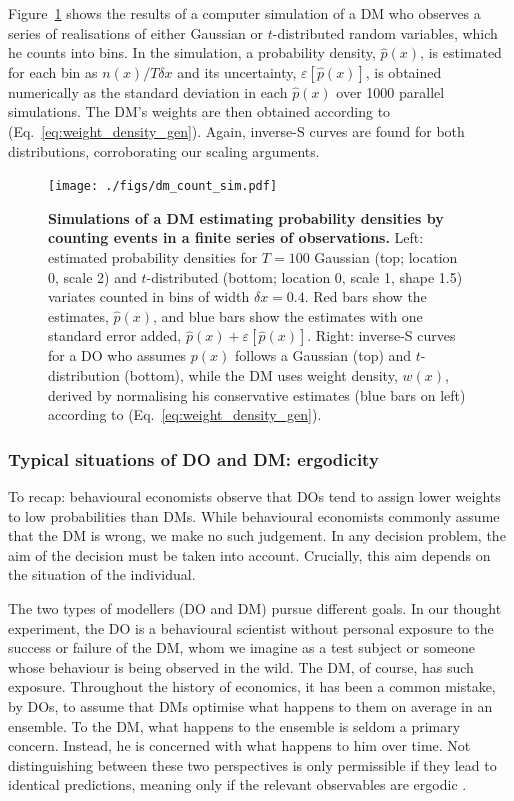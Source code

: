 \documentclass[a4paper, 12pt]{article}
\newcommand{\eref}[1]{(Eq.~\ref{eq:#1})}
\newcommand{\flabel}[1]{\label{fig:#1}}
\newcommand{\Fref}[1]{Figure~\ref{fig:#1}}
\newcommand{\err}[1]{\varepsilon\left[#1\right]}
\newcommand{\phat}{\hat{p}}
\begin{document}
\Fref{dm_count_sim} shows the results of a computer simulation of a DM who observes a series of realisations of either Gaussian or $t$-distributed random variables, which he counts into bins. In the simulation, a probability density, $\phat(x)$, is estimated for each bin as $n(x)/T\delta x$ and its uncertainty, $\err{\phat(x)}$, is obtained numerically as the standard deviation in each $\phat(x)$ over 1000 parallel simulations. The DM's weights are then obtained according to \eref{weight_density_gen}. Again, inverse-S curves are found for both distributions, corroborating our scaling arguments.
\begin{figure}[!htb]
\centering
\texttt{[image: ./figs/dm\_count\_sim.pdf]}
\caption{\textbf{Simulations of a DM estimating probability densities by counting events in a finite series of observations.} Left: estimated probability densities for $T=100$ Gaussian (top; location 0, scale 2) and $t$-distributed (bottom; location 0, scale 1, shape 1.5) variates counted in bins of width $\delta x=0.4$. Red bars show the estimates, $\phat(x)$, and blue bars show the estimates with one standard error added, $\phat(x)+\err{\phat(x)}$. Right: inverse-S curves for a DO who assumes $p(x)$ follows a Gaussian (top) and $t$-distribution (bottom), while the DM uses weight density, $w(x)$, derived by normalising his conservative estimates (blue bars on left) according to \eref{weight_density_gen}.
}
\flabel{dm_count_sim}
\end{figure}

\subsubsection{Typical situations of DO and DM: ergodicity}
To recap: behavioural economists observe that DOs tend to assign lower weights to low probabilities than DMs. While behavioural economists commonly assume that the DM is wrong, we make no such judgement. In any decision problem, the aim of the decision must be taken into account. Crucially, this aim depends on the situation of the individual.

The two types of modellers (DO and DM) pursue different goals. In our thought experiment, the DO is a behavioural scientist without personal exposure to the success or failure of the DM, whom we imagine as a test subject or someone whose behaviour is being observed in the wild. The DM, of course, has such exposure. Throughout the history of economics, it has been a common mistake, by DOs, to assume that DMs optimise what happens to them on average in an ensemble. To the DM, what happens to the ensemble is seldom a primary concern. Instead, he is concerned with what happens to him over time. Not distinguishing between these two perspectives is only permissible if they lead to identical predictions, meaning only if the relevant observables are ergodic \parencite{Peters2019b}.
\end{document}
